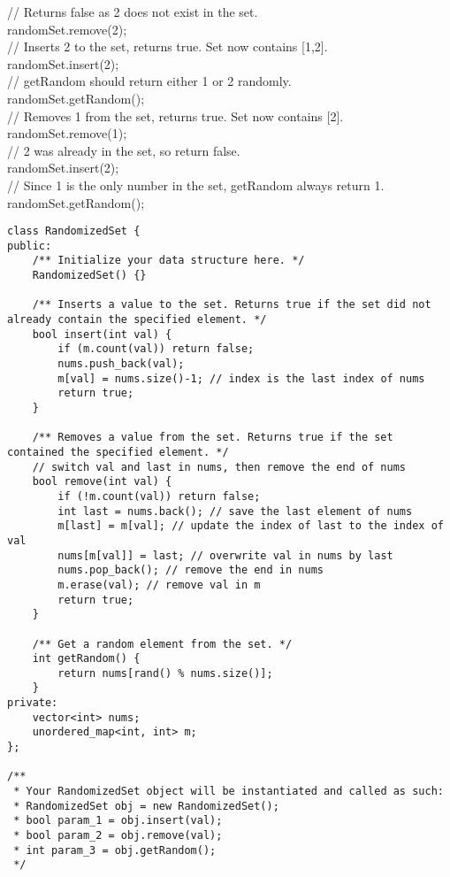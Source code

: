 // Returns false as 2 does not exist in the set.\\
randomSet.remove(2);\\

// Inserts 2 to the set, returns true. Set now contains [1,2].\\
randomSet.insert(2);\\

// getRandom should return either 1 or 2 randomly.\\
randomSet.getRandom();\\

// Removes 1 from the set, returns true. Set now contains [2].\\
randomSet.remove(1);\\

// 2 was already in the set, so return false.\\
randomSet.insert(2);\\

// Since 1 is the only number in the set, getRandom always return 1.\\
randomSet.getRandom();\\

\begin{lstlisting}
class RandomizedSet {
public:
    /** Initialize your data structure here. */
    RandomizedSet() {}
    
    /** Inserts a value to the set. Returns true if the set did not already contain the specified element. */
    bool insert(int val) {
        if (m.count(val)) return false;
        nums.push_back(val);
        m[val] = nums.size()-1; // index is the last index of nums
        return true;
    }
    
    /** Removes a value from the set. Returns true if the set contained the specified element. */
    // switch val and last in nums, then remove the end of nums
    bool remove(int val) {
        if (!m.count(val)) return false;
        int last = nums.back(); // save the last element of nums
        m[last] = m[val]; // update the index of last to the index of val
        nums[m[val]] = last; // overwrite val in nums by last
        nums.pop_back(); // remove the end in nums
        m.erase(val); // remove val in m
        return true;
    }
    
    /** Get a random element from the set. */
    int getRandom() {
        return nums[rand() % nums.size()];
    }
private:
    vector<int> nums;
    unordered_map<int, int> m;
};

/**
 * Your RandomizedSet object will be instantiated and called as such:
 * RandomizedSet obj = new RandomizedSet();
 * bool param_1 = obj.insert(val);
 * bool param_2 = obj.remove(val);
 * int param_3 = obj.getRandom();
 */
\end{lstlisting}


